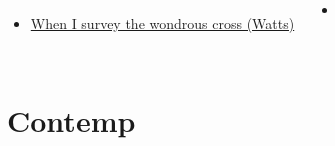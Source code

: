 \documentclass{beamer}
\begin{document}
            \begin{frame}[t]
            \begin{columns}[t]
        \begin{itemize}
    \item \hyperlink{When I survey the wondrous cross[](Watts)}{When I survey the wondrous cross (Watts)} \phantom{}
\end{itemize}
        \begin{itemize}
            \item[] \phantom{1}\end{itemize}


\end{columns}

\end{frame}
\section{Contemp}
\end{document}
